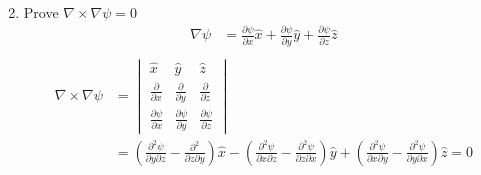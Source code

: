 \documentclass[12pt]{article}
\begin{document}
\begin{enumerate}
\begin{align*}
	      \end{align*}
	\item Prove \(\nabla \times \nabla \psi = 0 \)
	      \begin{align*}
		      \nabla \psi & = \frac{\partial \psi}{\partial x} \hat{x} + \frac{\partial \psi}{\partial y} \hat{y} + \frac{\partial \psi}{\partial z} \hat{z} \\
	      \end{align*}
	      \begin{align*}
		      \nabla \times \nabla \psi & =
		      \begin{vmatrix}
			      \hat{x}                          & \hat{y}                          & \hat{z}                          \\
			      \frac{\partial}{\partial x}      & \frac{\partial}{\partial y}      & \frac{\partial}{\partial z}      \\
			      \frac{\partial \psi}{\partial x} & \frac{\partial \psi}{\partial y} & \frac{\partial \psi}{\partial z}
		      \end{vmatrix}                                                                                                                                                                                                                                                                            \\
		                                & = \left(\frac{\partial^2\psi}{\partial y \partial z} - \frac{\partial^2}{\partial z \partial y}\right)\hat{x} - \left(\frac{\partial^2\psi}{\partial x \partial z} - \frac{\partial^2\psi}{\partial z \partial x}\right)\hat{y} + \left(\frac{\partial^2\psi}{\partial x \partial y} - \frac{\partial^2\psi}{\partial y \partial x}\right)\hat{z} = 0
	      \end{align*}
\end{enumerate}
\end{document}
